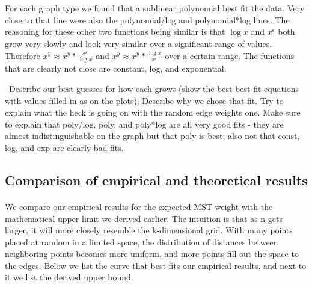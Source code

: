 \begin{figure*}[htb!]
\centering
\mbox{
\quad
{}
}
\mbox{
\quad
{}
}
\label{fig:part2-fit}
\end{figure*}

\paragraph{}
For each graph type we found that a sublinear polynomial best fit
the data. Very close to that line were also the polynomial/log and
polynomial*log lines. The reasoning for these other two functions being
similar is that $\log x$ and $x^\epsilon$ both grow very slowly and look
very similar over a significant range of values. Therefore $x^y \approx
x^y * \frac{x^\epsilon}{\log x}$ and $x^y \approx x^y * \frac{\log
  x}{x^\epsilon}$ over a certain range. The functions that are clearly not
close are constant, log, and exponential.

--Describe our best guesses for how each grows (show the best best-fit equations
with values filled in as on the plots).  Describe why we chose that fit.  Try to
explain what the heck is going on with the random edge weights one.  Make sure
to explain that poly/log, poly, and poly*log are all very good fits - they are
almost indistinguishable on the graph but that poly is best; also not that
const, log, and exp are clearly bad fits.

\subsection{Comparison of empirical and theoretical results}
\paragraph{}
We compare our empirical results for the expected MST weight with the
mathematical upper limit we derived earlier. The intuition is that as n
gets larger, it will more closely resemble the k-dimensional grid. With
many points placed at random in a limited space, the distribution of
distances between neighboring points becomes more uniform, and more points
fill out the space to the edges. Below we
list the curve that best fits our empirical results, and next to it we
list the derived upper bound.

